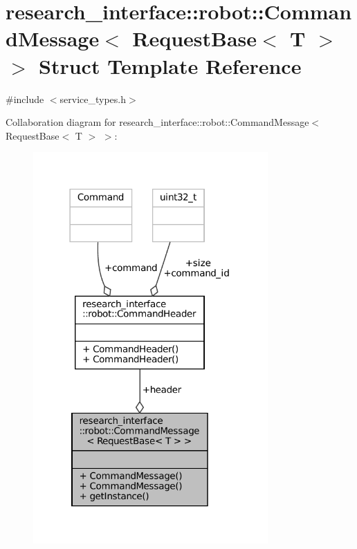 \hypertarget{structresearch__interface_1_1robot_1_1CommandMessage_3_01RequestBase_3_01T_01_4_01_4}{}\section{research\+\_\+interface\+:\+:robot\+:\+:Command\+Message$<$ Request\+Base$<$ T $>$ $>$ Struct Template Reference}
\label{structresearch__interface_1_1robot_1_1CommandMessage_3_01RequestBase_3_01T_01_4_01_4}


{\ttfamily \#include $<$service\+\_\+types.\+h$>$}



Collaboration diagram for research\+\_\+interface\+:\+:robot\+:\+:Command\+Message$<$ Request\+Base$<$ T $>$ $>$\+:
\nopagebreak
\begin{figure}[H]
\begin{center}
\leavevmode
\includegraphics[width=254pt]{structresearch__interface_1_1robot_1_1CommandMessage_3_01RequestBase_3_01T_01_4_01_4__coll__graph}
\end{center}
\end{figure}
